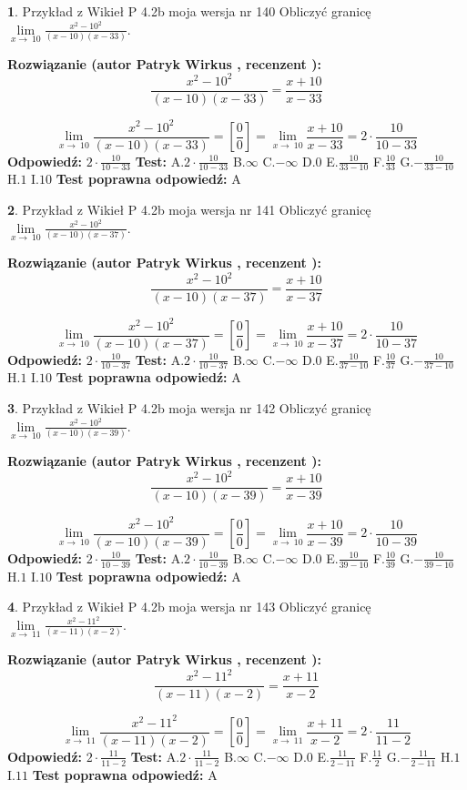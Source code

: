 \documentclass[12pt, a4paper]{article}
\theoremstyle{definition} %
\newtheorem{zad}{}
\newcommand{\zadStart}[1]{\begin{zad}#1\newline}
\newcommand{\zadStop}{\end{zad}}
\newcommand{\rozwStart}[2]{\noindent \textbf{Rozwiązanie (autor #1 , recenzent #2): }\newline}
\newcommand{\rozwStop}{\newline}
\newcommand{\odpStart}{\noindent \textbf{Odpowiedź:}\newline}
\newcommand{\odpStop}{\newline}
\newcommand{\testStart}{\noindent \textbf{Test:}\newline}
\newcommand{\testStop}{\newline}
\newcommand{\kluczStart}{\noindent \textbf{Test poprawna odpowiedź:}\newline}
\newcommand{\kluczStop}{\newline}
\begin{document}
\zadStart{Przykład z Wikieł P 4.2b moja wersja nr 140}
Obliczyć granicę $\lim\limits_{x\to\ 10}\frac{x^{2}-10^{2}}{(x-10)(x-33)}$.
\zadStop
\rozwStart{Patryk Wirkus}{}
$$\frac{x^{2}-10^{2}}{(x-10)(x-33)}=\frac{x+10}{x-33}$$

$$\lim\limits_{x\to\ 10}\frac{x^{2}-10^{2}}{(x-10)(x-33)}=[\frac{0}{0}]=\lim\limits_{x\to\ 10}\frac{x+10}{x-33}=2 \cdot \frac{10}{10-33}$$
\rozwStop
\odpStart
$2 \cdot \frac{10}{10-33}$
\odpStop
\testStart
A.$2 \cdot \frac{10}{10-33}$
B.$\infty$
C.$-\infty$
D.$0$
E.$\frac{10}{33-10}$
F.$\frac{10}{33}$
G.$-\frac{10}{33-10}$
H.$1$
I.$10$
\testStop
\kluczStart
A
\kluczStop



\zadStart{Przykład z Wikieł P 4.2b moja wersja nr 141}
Obliczyć granicę $\lim\limits_{x\to\ 10}\frac{x^{2}-10^{2}}{(x-10)(x-37)}$.
\zadStop
\rozwStart{Patryk Wirkus}{}
$$\frac{x^{2}-10^{2}}{(x-10)(x-37)}=\frac{x+10}{x-37}$$

$$\lim\limits_{x\to\ 10}\frac{x^{2}-10^{2}}{(x-10)(x-37)}=[\frac{0}{0}]=\lim\limits_{x\to\ 10}\frac{x+10}{x-37}=2 \cdot \frac{10}{10-37}$$
\rozwStop
\odpStart
$2 \cdot \frac{10}{10-37}$
\odpStop
\testStart
A.$2 \cdot \frac{10}{10-37}$
B.$\infty$
C.$-\infty$
D.$0$
E.$\frac{10}{37-10}$
F.$\frac{10}{37}$
G.$-\frac{10}{37-10}$
H.$1$
I.$10$
\testStop
\kluczStart
A
\kluczStop



\zadStart{Przykład z Wikieł P 4.2b moja wersja nr 142}
Obliczyć granicę $\lim\limits_{x\to\ 10}\frac{x^{2}-10^{2}}{(x-10)(x-39)}$.
\zadStop
\rozwStart{Patryk Wirkus}{}
$$\frac{x^{2}-10^{2}}{(x-10)(x-39)}=\frac{x+10}{x-39}$$

$$\lim\limits_{x\to\ 10}\frac{x^{2}-10^{2}}{(x-10)(x-39)}=[\frac{0}{0}]=\lim\limits_{x\to\ 10}\frac{x+10}{x-39}=2 \cdot \frac{10}{10-39}$$
\rozwStop
\odpStart
$2 \cdot \frac{10}{10-39}$
\odpStop
\testStart
A.$2 \cdot \frac{10}{10-39}$
B.$\infty$
C.$-\infty$
D.$0$
E.$\frac{10}{39-10}$
F.$\frac{10}{39}$
G.$-\frac{10}{39-10}$
H.$1$
I.$10$
\testStop
\kluczStart
A
\kluczStop



\zadStart{Przykład z Wikieł P 4.2b moja wersja nr 143}
Obliczyć granicę $\lim\limits_{x\to\ 11}\frac{x^{2}-11^{2}}{(x-11)(x-2)}$.
\zadStop
\rozwStart{Patryk Wirkus}{}
$$\frac{x^{2}-11^{2}}{(x-11)(x-2)}=\frac{x+11}{x-2}$$

$$\lim\limits_{x\to\ 11}\frac{x^{2}-11^{2}}{(x-11)(x-2)}=[\frac{0}{0}]=\lim\limits_{x\to\ 11}\frac{x+11}{x-2}=2 \cdot \frac{11}{11-2}$$
\rozwStop
\odpStart
$2 \cdot \frac{11}{11-2}$
\odpStop
\testStart
A.$2 \cdot \frac{11}{11-2}$
B.$\infty$
C.$-\infty$
D.$0$
E.$\frac{11}{2-11}$
F.$\frac{11}{2}$
G.$-\frac{11}{2-11}$
H.$1$
I.$11$
\testStop
\kluczStart
A
\kluczStop
\end{document}
